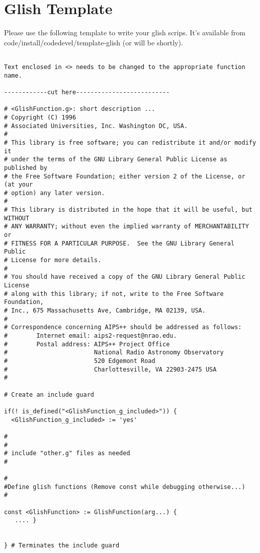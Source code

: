 \section{Glish Template}
Please use the following template to write your glish scrips.  It's available
from code/install/codedevel/template-glish (or will be shortly).
\begin{verbatim}

Text enclosed in <> needs to be changed to the appropriate function name.

------------cut here--------------------------

# <GlishFunction.g>: short description ...
# Copyright (C) 1996
# Associated Universities, Inc. Washington DC, USA.
#
# This library is free software; you can redistribute it and/or modify it
# under the terms of the GNU Library General Public License as published by
# the Free Software Foundation; either version 2 of the License, or (at your
# option) any later version.
#
# This library is distributed in the hope that it will be useful, but WITHOUT
# ANY WARRANTY; without even the implied warranty of MERCHANTABILITY or
# FITNESS FOR A PARTICULAR PURPOSE.  See the GNU Library General Public
# License for more details.
#
# You should have received a copy of the GNU Library General Public License
# along with this library; if not, write to the Free Software Foundation,
# Inc., 675 Massachusetts Ave, Cambridge, MA 02139, USA.
#
# Correspondence concerning AIPS++ should be addressed as follows:
#        Internet email: aips2-request@nrao.edu.
#        Postal address: AIPS++ Project Office
#                        National Radio Astronomy Observatory
#                        520 Edgemont Road
#                        Charlottesville, VA 22903-2475 USA
#

# Create an include guard

if(! is_defined("<GlishFunction_g_included>")) {
  <GlishFunction_g_included> := 'yes'

#
#
# include "other.g" files as needed
#

#
#Define glish functions (Remove const while debugging otherwise...)
#

const <GlishFunction> := GlishFunction(arg...) {  
   .... }


} # Terminates the include guard


\end{verbatim}
